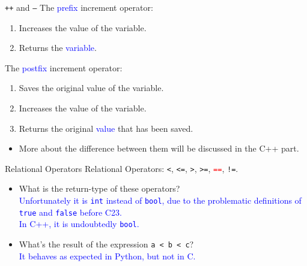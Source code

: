 \documentclass[handout]{beamer}
\newcommand{\red}[1]{\textcolor{red}{#1}}
\newcommand{\blue}[1]{\textcolor{blue}{#1}}
\newcommand{\ttt}[1]{\texttt{#1}}
\newcommand{\redtt}[1]{\red{\ttt{#1}}}
\begin{document}
\begin{frame}[fragile]{\ttt{++} and \ttt{--}}
    The \blue{prefix} increment operator:
    \begin{enumerate}
        \item Increases the value of the variable.
        \item Returns the \blue{variable}.
    \end{enumerate}
    \pause
    The \blue{postfix} increment operator:
    \begin{enumerate}
        \item Saves the original value of the variable.
        \item Increases the value of the variable.
        \item Returns the original \blue{value} that has been saved.
    \end{enumerate}
    \pause
    \begin{itemize}
        \item More about the difference between them will be discussed in the C++ part.
    \end{itemize}
\end{frame}

\begin{frame}{Relational Operators}
    Relational Operators: \ttt{<}, \ttt{<=}, \ttt{>}, \ttt{>=}, \redtt{==}, \ttt{!=}.
    \begin{itemize}
        \item What is the return-type of these operators?\\
        \pause
        \blue{Unfortunately it is \ttt{int} instead of \ttt{bool}, due to the problematic definitions of \ttt{true} and \ttt{false} before C23.}\\
        \blue{In C++, it is undoubtedly \ttt{bool}.}
        \pause
        \item What's the result of the expression \ttt{a < b < c}?\\
        \pause
        \blue{It behaves as expected in Python, but not in C.}
    \end{itemize}
\end{frame}
\end{document}
